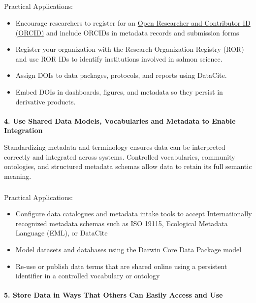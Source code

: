 \documentclass[
  letterpaper,
  DIV=11,
  numbers=noendperiod]{scrartcl}
\makeatletter
\let\oldparagraph\paragraph
\renewcommand{\paragraph}{
    \@ifstar
      \xxxParagraphStar
      \xxxParagraphNoStar
  }
\newcommand{\xxxParagraphStar}[1]{\oldparagraph*{#1}\mbox{}}
\newcommand{\xxxParagraphNoStar}[1]{\oldparagraph{#1}\mbox{}}
\let\oldsubparagraph\subparagraph
\renewcommand{\subparagraph}{
    \@ifstar
      \xxxSubParagraphStar
      \xxxSubParagraphNoStar
  }
\newcommand{\xxxSubParagraphStar}[1]{\oldsubparagraph*{#1}\mbox{}}
\newcommand{\xxxSubParagraphNoStar}[1]{\oldsubparagraph{#1}\mbox{}}
\makeatother
\begin{document}
\subparagraph{Practical Applications:}\label{practical-applications-2}

\begin{itemize}
\item
  Encourage researchers to register for an
  \href{https://orcid.org/}{Open Researcher and Contributor ID (ORCID)}
  and include ORCIDs in metadata records and submission forms
\item
  Register your organization with the Research Organization Registry
  (ROR) and use ROR IDs to identify institutions involved in salmon
  science.
\item
  Assign DOIs to data packages, protocols, and reports using DataCite.
\item
  Embed DOIs in dashboards, figures, and metadata so they persist in
  derivative products.
\end{itemize}

\paragraph{\texorpdfstring{\textbf{4. Use Shared Data Models,
Vocabularies and Metadata to Enable
Integration}}{4. Use Shared Data Models, Vocabularies and Metadata to Enable Integration}}\label{use-shared-data-models-vocabularies-and-metadata-to-enable-integration}

Standardizing metadata and terminology ensures data can be interpreted
correctly and integrated across systems. Controlled vocabularies,
community ontologies, and structured metadata schemas allow data to
retain its full semantic meaning.

\subparagraph{Practical Applications:}\label{practical-applications-3}

\begin{itemize}
\item
  Configure data catalogues and metadata intake tools to accept
  Internationally recognized metadata schemas such as ISO 19115,
  Ecological Metadata Language (EML), or DataCite
\item
  Model datasets and databases using the Darwin Core Data Package model
\item
  Re-use or publish data terms that are shared online using a persistent
  identifier in a controlled vocabulary or ontology
\end{itemize}

\paragraph{\texorpdfstring{\textbf{5. Store Data in Ways That Others Can
Easily Access and
Use}}{5. Store Data in Ways That Others Can Easily Access and Use}}\label{store-data-in-ways-that-others-can-easily-access-and-use}
\end{document}
